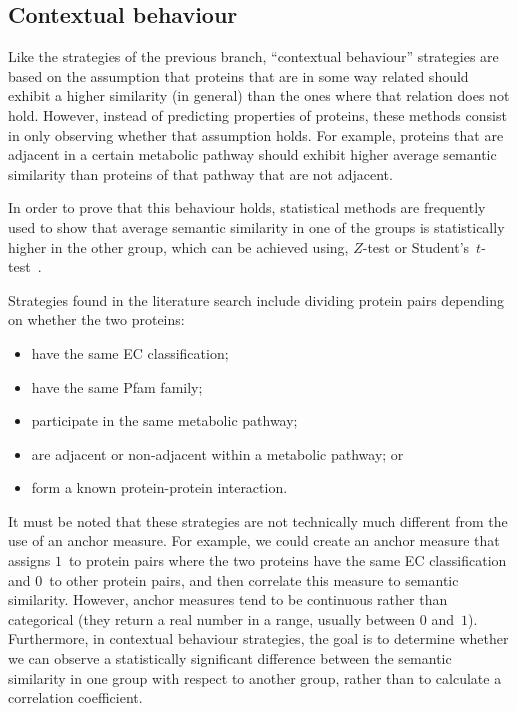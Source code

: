 \subsection{Contextual behaviour} \label{sub:hierarchy/contextual}

Like the strategies of the previous branch, ``contextual behaviour'' strategies are based on the assumption that proteins that are in some way related should exhibit a higher similarity (in general) than the ones where that relation does not hold. However, instead of predicting properties of proteins, these methods consist in only observing whether that assumption holds. For example, proteins that are adjacent in a certain metabolic pathway should exhibit higher average semantic similarity than proteins of that pathway that are not adjacent.

In order to prove that this behaviour holds, statistical methods are frequently used to show that average semantic similarity in one of the groups is statistically higher in the other group, which can be achieved using, \eg \hbox{$Z$-test} or Student's~\hbox{$t$-test}~\citep{Rosner2010}.

Strategies found in the literature search include dividing protein pairs depending on whether the two proteins:
\begin{itemize}
    \item have the same EC classification;
    \item have the same Pfam family;
    \item participate in the same metabolic pathway;
    \item are adjacent or non-adjacent within a metabolic pathway; or
    \item form a known protein-protein interaction.
\end{itemize}

It must be noted that these strategies are not technically much different from the use of an anchor measure. For example, we could create an anchor measure that assigns $1$~to protein pairs where the two proteins have the same EC classification and $0$~to other protein pairs, and then correlate this measure to semantic similarity. However, anchor measures tend to be continuous rather than categorical (they return a real number in a range, usually between $0$ and~$1$). Furthermore, in contextual behaviour strategies, the goal is to determine whether we can observe a statistically significant difference between the semantic similarity in one group with respect to another group, rather than to calculate a correlation coefficient.


